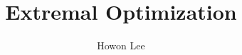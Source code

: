 \documentclass{beamer}
\begin{document}
\title{Extremal Optimization}
\author{Howon Lee}
\maketitle


\begin{frame}

\end{frame}
\end{document}
